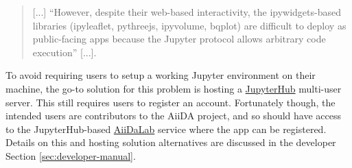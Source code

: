 \begin{quote}
    [...] ``However, despite their web-based interactivity, the ipywidgets-based
    libraries (ipyleaflet, pythreejs, ipyvolume, bqplot) are difficult to deploy
    as public-facing apps because the Jupyter protocol allows arbitrary code
    execution'' [...].
\end{quote}

To avoid requiring users to setup a working Jupyter environment on their
machine, the go-to solution for this problem is hosting a
\href{https://jupyter.org/hub}{JupyterHub} multi-user server. This still
requires users to register an account. Fortunately though, the intended users
are contributors to the AiiDA project, and so should have access to the
JupyterHub-based \href{ https://aiidalab.materialscloud.org/}{AiiDaLab} service
where the app can be registered. Details on this and hosting solution
alternatives are discussed in the developer Section \vref{sec:developer-manual}. 



